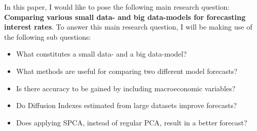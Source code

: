 In this paper, I would like to pose the following main research question:
\textbf{Comparing various small data- and big data-models for forecasting interest rates}. To answer this main research question, I will be making use of the following sub questions:
\begin{itemize}
	\item What constitutes a small data- and a big data-model?
	\item What methods are useful for comparing two different model forecasts?
	\item Is there accuracy to be gained by including macroeconomic variables?
	\item Do Diffusion Indexes estimated from large datasets improve forecasts?
	\item Does applying SPCA, instead of regular PCA, result in a better forecast?
\end{itemize}